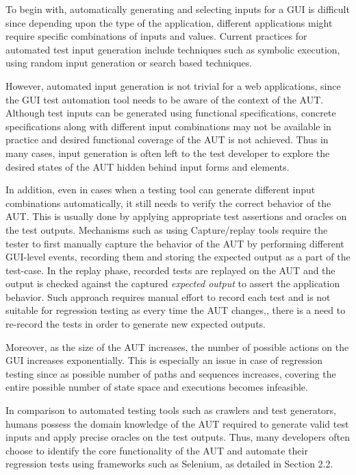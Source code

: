 To begin with, automatically generating and selecting inputs for a GUI is difficult since depending upon the type of the application, different applications might require specific combinations of inputs and values. 
Current practices for automated test input generation include techniques such as symbolic execution\cite{Ganovetal}, using random input generation\cite{godefroid2005dart} or search based techniques\cite{gross2012search}.

However, automated input generation is not trivial for a web applications, since the GUI test automation tool needs to be aware of the context of the AUT. Although test inputs can be generated using functional specifications, concrete specifications along with different input combinations may not be available in practice and desired functional coverage of the AUT is not achieved. Thus in many cases, input generation is often left to the test developer to explore the desired states of the AUT hidden behind input forms and elements.

In addition, even in cases when a testing tool can generate different input combinations automatically, it still needs to verify the correct behavior of the AUT. This is usually done by applying appropriate test assertions and oracles on the test outputs\cite{Baresi:Oracles}. Mechanisms such as using Capture/replay tools\cite{joshi2006capture} require the tester to first manually capture the behavior of the AUT by performing different GUI-level events, recording them and storing the expected output as a part of the test-case. In the replay phase, recorded tests are replayed on the AUT and the output is checked against the captured \textit{expected output} to assert the application behavior. Such approach requires manual effort to record each test and is not suitable for regression testing as every time the AUT changes\cite{sjosten2006costs},\cite{leotta2013capture}, there is a need to re-record the tests in order to generate new expected outputs. 

Moreover, as the size of the AUT increases, the number of possible actions on the GUI increases exponentially. This is especially an issue in case of regression testing since as possible number of paths and sequences increases, covering the entire possible number of state space and executions becomes infeasible.

In comparison to automated testing tools such as crawlers and test generators, humans possess the domain knowledge of the AUT required to generate valid test inputs and apply precise oracles on the test outputs. Thus, many developers often choose to identify the core functionality of the AUT and automate their regression tests using frameworks such as Selenium\cite{websiteSelenium}, as detailed in Section 2.2.

